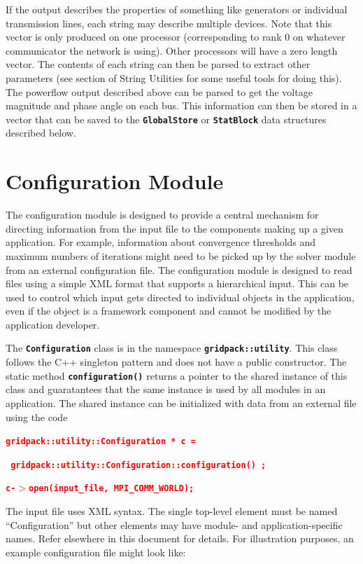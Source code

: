 \documentclass[12pt]{report} %
\begin{document}
If the output describes the properties of something like generators or individual transmission lines, each string may describe multiple devices. Note that this vector is only produced on one processor (corresponding to rank 0 on whatever communicator the network is using). Other processors will have a zero length vector. The contents of each string can then be parsed to extract other parameters (see section of String Utilities for some useful tools for doing this). The powerflow output described above can be parsed to get the voltage magnitude and phase angle on each bus. This information can then be stored in a vector that can be saved to the \texttt{\textbf{GlobalStore}} or \texttt{\textbf{StatBlock}} data structures described below.

\section{Configuration Module }

The configuration module is designed to provide a central mechanism for directing information from the input file to the components making up a given application. For example, information about convergence thresholds and maximum numbers of iterations might need to be picked up by the solver module from an external configuration file. The configuration module is designed to read files using a simple XML format that supports a hierarchical input. This can be used to control which input gets directed to individual objects in the application, even if the object is a framework component and cannot be modified by the application developer.

The \texttt{\textbf{Configuration}} class is in the namespace \texttt{\textbf{gridpack::utility}}. This class follows the C++ singleton pattern and does not have a public constructor. The static method \texttt{\textbf{configuration()}} returns a pointer to the shared instance of this class and guaratantees that the same instance is used by all modules in an application. The shared instance can be initialized with data from an external file using the code

\textcolor{red}{\texttt{\textbf{gridpack::utility::Configuration * c = }}}

\textcolor{red}{\texttt{\textbf{  gridpack::utility::Configuration::configuration() ; }}}

\textcolor{red}{\texttt{\textbf{c-$\boldsymbol{\mathrm{>}}$open(input\_file, MPI\_COMM\_WORLD);}}}

The input file uses XML syntax. The single top-level element must be named ``Configuration'' but other elements may have module- and application-specific names. Refer elsewhere in this document for details.  For illustration purposes, an example configuration file might look like: 
\end{document}
